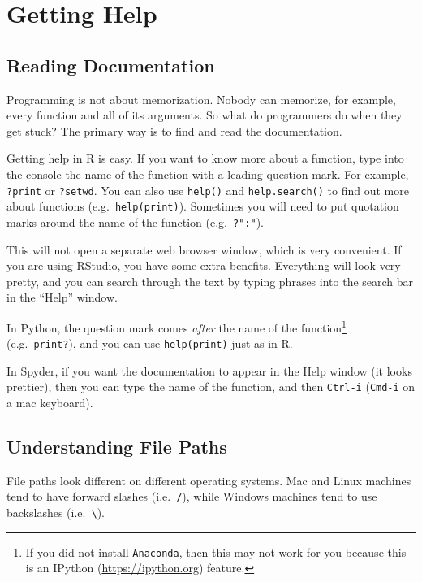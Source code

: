 \documentclass[12pt,krantz2]{krantz}
\begin{document}
\hypertarget{getting-help}{%
\section{Getting Help}\label{getting-help}}

\hypertarget{reading-documentation}{%
\subsection{Reading Documentation}\label{reading-documentation}}

Programming is not about memorization. Nobody can memorize, for example, every function and all of its arguments. So what do programmers do when they get stuck? The primary way is to find and read the documentation.

Getting help in R is easy. If you want to know more about a function, type into the console the name of the function with a leading question mark. For example, \texttt{?print} or \texttt{?setwd}. You can also use \texttt{help()} and \texttt{help.search()} to find out more about functions (e.g.~\texttt{help(print)}). Sometimes you will need to put quotation marks around the name of the function (e.g.~\texttt{?":"}).

This will not open a separate web browser window, which is very convenient. If you are using RStudio, you have some extra benefits. Everything will look very pretty, and you can search through the text by typing phrases into the search bar in the ``Help'' window.

In Python, the question mark comes \emph{after} the name of the function\footnote{If you did not install \texttt{Anaconda}, then this may not work for you because this is an IPython (\url{https://ipython.org}) feature.} (e.g.~\texttt{print?}), and you can use \texttt{help(print)} just as in R.

In Spyder, if you want the documentation to appear in the Help window (it looks prettier), then you can type the name of the function, and then \texttt{Ctrl-i} (\texttt{Cmd-i} on a mac keyboard).

\hypertarget{understanding-file-paths}{%
\subsection{Understanding File Paths}\label{understanding-file-paths}}

File paths look different on different operating systems. Mac and Linux machines tend to have forward slashes (i.e.~\texttt{/}), while Windows machines tend to use backslashes (i.e.~\texttt{\textbackslash{}}).
\end{document}
